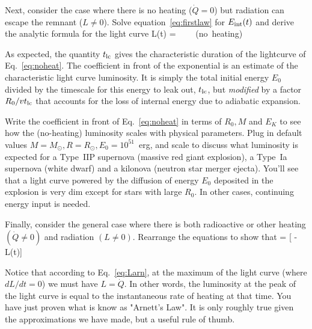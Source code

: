\documentclass{tufte-handout}
\newcommand{\Eint}{\ensuremath{E_{\rm int}}}
\newcommand{\tlc}{\ensuremath{t_{\rm lc}}}
\begin{document}




 Next, consider the case where there is no heating ($\dot{Q} = 0$) but 
radiation can escape the remnant ($L \ne 0$). 
Solve equation~\ref{eq:firstlaw} for 
$\Eint(t)$ and derive the analytic formula for the light curve
\beq
L(t) = \frac{ E_0}{\tlc} \frac{R_0}{v \tlc}  \exp\left[ - \frac{(t + t_0)^2}{2 \tlc^2} \right]~~~~{\rm (no~heating)}
\label{eq:noheat}
\eeq

\comment As expected, the quantity $\tlc$ gives the characteristic duration of the lightcurve of Eq.~\ref{eq:noheat}. The coefficient in front of the exponential is an estimate of the characteristic light curve
luminosity. It is simply the total initial energy $E_0$ divided by the timescale for this  energy to leak out, \tlc,
but {\it modified} by a factor $R_0/v \tlc$ that accounts for the loss of internal energy due to adiabatic expansion.

 Write the coefficient in front of Eq.~\ref{eq:noheat} in terms of $R_0, M$ and $E_K$ to see how the (no-heating) luminosity scales with physical parameters. Plug in default values  $M = M_\odot, R = R_\odot, E_0 = 10^{51}$~erg, and scale to discuss what luminosity is expected for a Type~IIP supernova (massive red giant explosion), a Type~Ia supernova (white dwarf) and a kilonova (neutron star merger ejecta). You'll see that a light curve powered by the diffusion of energy $E_0$ deposited in the explosion is very dim except for stars with large $R_0$. In other cases, continuing energy input is needed.

 Finally, consider the general case where there is both radioactive or other 
heating $(\dot{Q} \ne 0)$ and radiation $(L \ne 0)$. Rearrange the equations to show that
\beq
{} = \frac{(t + t_0)}{\tlc^2} [  - L(t)] 
\label{eq:Larn}
\eeq

\comment Notice that according to Eq.~\ref{eq:Larn}, at the maximum of the light curve  (where $dL/dt = 0$)  we must
have $L = \dot{Q}$. In other words, the luminosity at the peak of the light curve is 
equal to the instantaneous rate of heating at that time. You have just proven what
is know as "Arnett's Law". It is only roughly true given the approximations we have made,
but a useful rule of thumb.
\end{document}
